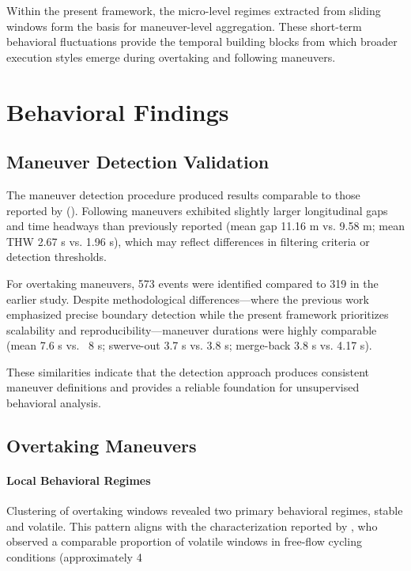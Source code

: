 Within the present framework, the micro-level regimes extracted from sliding windows form the basis for maneuver-level aggregation. These short-term behavioral fluctuations provide the temporal building blocks from which broader execution styles emerge during overtaking and following maneuvers.


\section{Behavioral Findings}
\subsection{Maneuver Detection Validation}

The maneuver detection procedure produced results comparable to those reported by \citeauthor{kutsch_analyzing_2025} (\citeyear{kutsch_analyzing_2025}). Following maneuvers exhibited slightly larger longitudinal gaps and time headways than previously reported (mean gap 11.16 m vs. 9.58 m; mean THW 2.67 s vs. 1.96 s), which may reflect differences in filtering criteria or detection thresholds.

For overtaking maneuvers, 573 events were identified compared to 319 in the earlier study. Despite methodological differences—where the previous work emphasized precise boundary detection while the present framework prioritizes scalability and reproducibility—maneuver durations were highly comparable (mean 7.6 s vs. ~8 s; swerve-out 3.7 s vs. 3.8 s; merge-back 3.8 s vs. 4.17 s).

These similarities indicate that the detection approach produces consistent maneuver definitions and provides a reliable foundation for unsupervised behavioral analysis.

\subsection{Overtaking Maneuvers}

\paragraph{Local Behavioral Regimes}
Clustering of overtaking windows revealed two primary behavioral regimes, stable and volatile. This pattern aligns with the characterization reported by \citeauthor{bachir_identifying_2025}, who observed a comparable proportion of volatile windows in free-flow cycling conditions (approximately 4 %

